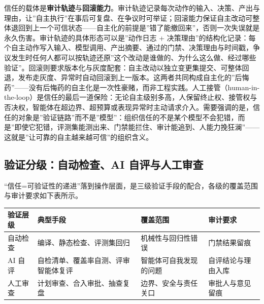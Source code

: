 \documentclass[
]{ctexbook}
\newcounter{none}
\begin{document}
信任的载体是\textbf{审计轨迹}与\textbf{回滚能力}。审计轨迹记录每次动作的输入、决策、产出与理由，让''自主执行''在事后可复盘、在争议时可举证；回滚能力保证自主改动可整体退回到上一个可信状态------自主化的前提是''错了能撤回来''，否则一次失误就是永久伤害。审计轨迹的具体形态可以是''动作日志
+
决策理由''的结构化记录：每个自主动作写入输入、模型调用、产出摘要、通过的门禁、决策理由与时间戳，争议发生时任何人都可以按轨迹还原''这个改动是谁做的、为什么这么做、经过哪些验证''。回滚则要求版本化与灰度配套：自主改动以独立变更集提交、可整体回退，发布走灰度、异常时自动回滚到上一版本。这两者共同构成自主化的''后悔药''------没有后悔药的自主化是一次性豪赌，而非工程实践。人工接管（human-in-the-loop）是信任的最后一道保险：无论自主级别多高，人保留终止权、接管权与否决权，智能体在超边界、超预算或表现异常时主动请求介入。需要强调的是，信任的对象是''验证链路''而不是''模型''：组织信任的不是某个模型不会犯错，而是''即使它犯错，评测集能测出来、门禁能拦住、审计能追到、人能力挽狂澜''------这就是''让可靠的自主越来越可信''的组织含义。

\subsection{验证分级：自动检查、AI
自评与人工审查}\label{ux9a8cux8bc1ux5206ux7ea7ux81eaux52a8ux68c0ux67e5ai-ux81eaux8bc4ux4e0eux4ebaux5de5ux5ba1ux67e5}

``信任=可验证性的递进''落到操作层面，是三级验证手段的配合，各级的覆盖范围与审计要求如下表所示。

{\def\LTcaptype{none} %
\begin{longtable}[]{@{}
  >{\raggedright\arraybackslash}p{}
  >{\raggedright\arraybackslash}p{}
  >{\raggedright\arraybackslash}p{}
  >{\raggedright\arraybackslash}p{}@{}}
\toprule\noalign{}
\begin{minipage}[b]{\linewidth}\raggedright
验证层级
\end{minipage} & \begin{minipage}[b]{\linewidth}\raggedright
典型手段
\end{minipage} & \begin{minipage}[b]{\linewidth}\raggedright
覆盖范围
\end{minipage} & \begin{minipage}[b]{\linewidth}\raggedright
审计要求
\end{minipage} \\
\midrule\noalign{}
\endhead
\bottomrule\noalign{}
\endlastfoot
自动检查 & 编译、静态检查、评测集回归 & 机械性与回归性错误 &
门禁结果留痕 \\
AI 自评 & 自检清单、覆盖率自测、评审智能体复评 & 智能体可自我发现的问题
& 自评结论与理由入库 \\
人工审查 & 计划审查、合入审批、抽查复盘 & 边界、安全与责任关口 &
审批人与意见留痕 \\
\end{longtable}
}
\end{document}
